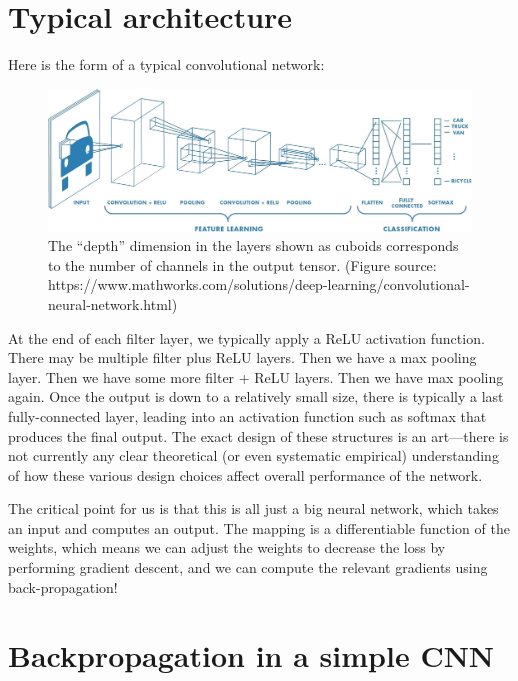\section{Typical architecture}
Here is the form of a typical convolutional network:
\begin{figure}[H]
  \includegraphics[width=\textwidth]{figures/cnn}
  \caption*{The ``depth'' dimension in the layers shown as cuboids
    corresponds to the number of channels in the output tensor.
    (Figure source: https://www.mathworks.com/solutions/deep-learning/convolutional-neural-network.html)}
\end{figure}

At the end of each filter layer, we typically apply a ReLU activation function. There may be multiple filter plus ReLU layers. Then we have a max pooling layer. Then we have some more filter + ReLU layers. Then we have max pooling again. Once the output is down to
a relatively small size, there is typically a last fully-connected
layer, leading into an activation function such as softmax that
produces the final output. The exact design of these structures is
an art---there is not currently any clear theoretical  (or even
systematic empirical) understanding of how these various design
choices affect overall performance of the network.

The critical point for us is that this is all just a big neural
network, which takes an input and computes an output.  The mapping is
a differentiable function
of the weights, which means we can adjust the weights to decrease the
loss by performing gradient descent, and we can compute the relevant
gradients using back-propagation!

\section{Backpropagation in a simple CNN}

